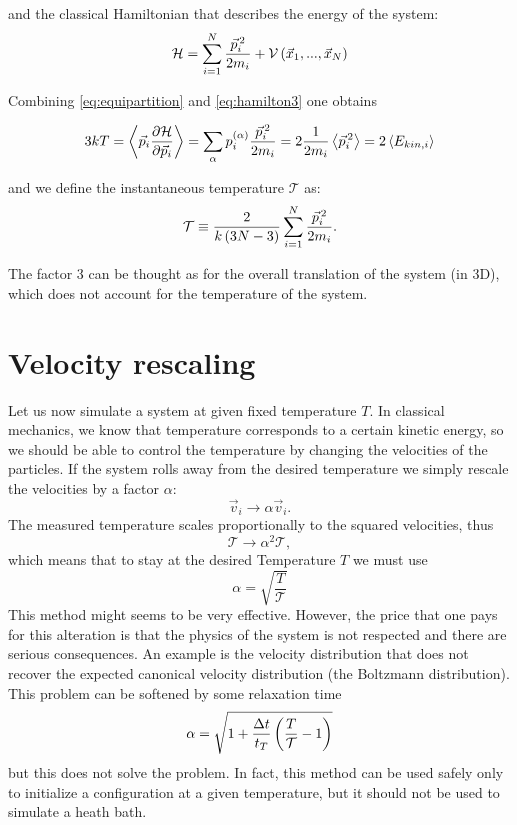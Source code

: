 \noindent
and the classical Hamiltonian that describes the energy of the system:
\begin{equation}
\mathcal{H}=
\sum_{i=1}^{N}{\frac{\vec{p}^{\,2}_i}{2m_i}+\mathcal{V}\left(\vec{x}_1,...,\vec{x}_N\right)}
\label{eq:hamilton3}
\end{equation}

Combining \eqref{eq:equipartition} and \eqref{eq:hamilton3} one obtains

\begin{equation}
3 kT = \left<\vec{p}_i \frac{\partial \mathcal{H}}{\partial \vec{p}_i}\right> =
\sum_{\alpha}{p_i^{\left(\alpha\right)}\frac{\vec{p}^{\,2}_i}{2m_i}} = 
2 \frac{1}{2 m_i} \left<\vec{p}^{\,2}_i\right> = 2 \left<E_{kin,i}\right>
\end{equation}


and we define  the instantaneous temperature $\mathcal{T}$ as:
\begin{equation}
\mathcal{T}\equiv \frac{2}{k\left(3N-3\right)} \sum_{i=1}^N {\frac{\vec{p}_i^{\,2}}{2m_i}}.
\end{equation}

The factor 3 can be thought as for the overall translation of the system (in 3D), which does not account for the temperature of the system.



\section{Velocity rescaling}


Let us now simulate a system at given fixed temperature $T$. In classical mechanics, we know that temperature corresponds to a certain kinetic energy, so we should be able to control the temperature by changing the velocities of the particles. If the system rolls away from the desired temperature we simply rescale the velocities by a factor $\alpha$:
\begin{equation}
\vec{v}_i \rightarrow \alpha \vec{v}_i.
\end{equation}
The measured temperature scales proportionally to the squared velocities, thus 
\begin{equation}
\mathcal{T} \rightarrow \alpha^2 \mathcal{T},
\end{equation}
which means that to stay at the desired Temperature $T$ we must use
\begin{equation}
\alpha = \sqrt{\frac{T}{ \mathcal{T}}}
\end{equation}
This method might seems to be very effective. However, the price that one pays for this alteration is that the physics of the system is not respected and there are serious consequences. An example is the velocity distribution that does not recover the expected canonical velocity distribution (the Boltzmann distribution). This problem can be softened by some relaxation time 
\begin{equation}
\alpha = \sqrt{1 + \frac{\Delta t}{t_T}\left(\frac{T}{\mathcal{T}}-1\right)}
\label{eq:relaxation}
\end{equation} 
but this does not solve the problem. In fact, this method can be used safely only to initialize a configuration at a given temperature, but it should not be used to simulate a heath bath.

